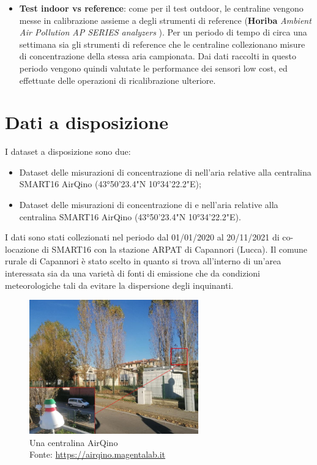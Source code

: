 \begin{itemize}
  \item \textbf{Test indoor vs reference}: come per il test outdoor, le centraline vengono messe in calibrazione assieme a degli strumenti di reference (\textbf{Horiba} \textit{Ambient Air Pollution AP SERIES analyzers} \cite{horiba}). Per un periodo di tempo di circa una settimana sia gli strumenti di reference che le centraline collezionano misure di concentrazione della stessa aria campionata. Dai dati raccolti in questo periodo vengono quindi valutate le performance dei sensori low cost, ed effettuate delle operazioni di ricalibrazione ulteriore. \cite{relazione_alice}
\end{itemize}

\section{Dati a disposizione}\label{sec:dati}
I dataset a disposizione sono due:

\begin{itemize}
  \item Dataset delle misurazioni di concentrazione di  nell'aria relative alla centralina SMART16 AirQino (43°50'23.4"N 10°34'22.2"E);
  \item Dataset delle misurazioni di concentrazione di  e  nell'aria relative alla centralina SMART16 AirQino (43°50'23.4"N 10°34'22.2"E).
\end{itemize}

I dati sono stati collezionati nel periodo dal 01/01/2020 al 20/11/2021 di co-locazione di SMART16 con la stazione ARPAT di Capannori (Lucca).
Il comune rurale di Capannori è stato scelto in quanto si trova all'interno di un'area interessata sia da una varietà di fonti di emissione che da condizioni meteorologiche tali da evitare la dispersione degli inquinanti.

\begin{figure}[H]
\centering
\captionsetup{justification=centering}
\includegraphics[width=0.65\textwidth,height=\textheight,keepaspectratio]{img/smart72.jpg}
\caption{Una centralina AirQino\\Fonte: \url{https://airqino.magentalab.it}}
\label{fig:smart72}
\end{figure}

